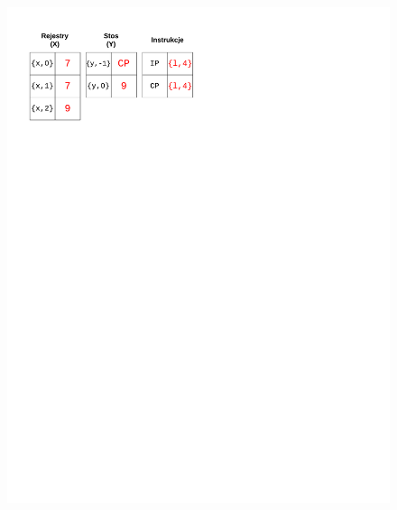 \begin{figure}
\begin{multicols}{2}
\vspace{-4mm}
\begin{Figure}
 \centering
 \includegraphics[scale=0.65, clip, trim=10mm 215mm 110mm 10mm]{interpreter_max_5}
\label{fig:max5}
\end{Figure}


\end{multicols}
\end{figure}
